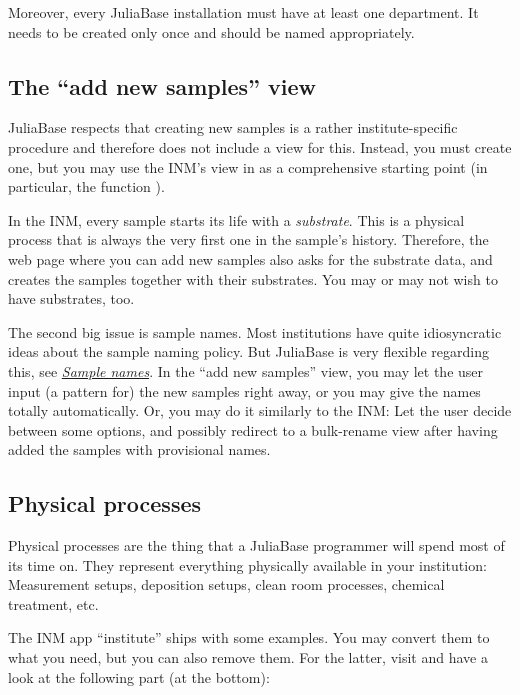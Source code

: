 \documentclass[a4paper,11pt,english]{sphinxmanual}
\begin{document}
Moreover, every JuliaBase installation must have at least one department.  It
needs to be created only once and should be named appropriately.


\subsection{The “add new samples” view}
\label{programming/programming:index-4}\label{programming/programming:the-add-new-samples-view}
JuliaBase respects that creating new samples is a rather institute-specific
procedure and therefore does not include a view for this.  Instead, you must
create one, but you may use the INM's view in
 as a comprehensive starting point (in
particular, the function ).

In the INM, every sample starts its life with a \emph{substrate}.  This is a
physical process that is always the very first one in the sample's history.
Therefore, the web page where you can add new samples also asks for the
substrate data, and creates the samples together with their substrates.  You
may or may not wish to have substrates, too.

The second big issue is sample names.  Most institutions have quite
idiosyncratic ideas about the sample naming policy.  But JuliaBase is very
flexible regarding this, see {\hyperref[programming/sample_names::doc]{\emph{Sample names}}}.  In the “add new samples”
view, you may let the user input (a pattern for) the new samples right away, or
you may give the names totally automatically.  Or, you may do it similarly to
the INM: Let the user decide between some options, and possibly redirect to a
bulk-rename view after having added the samples with provisional names.


\subsection{Physical processes}
\label{programming/programming:index-5}\label{programming/programming:physical-processes}
Physical processes are the thing that a JuliaBase programmer will spend most of
its time on.  They represent everything physically available in your
institution: Measurement setups, deposition setups, clean room processes,
chemical treatment, etc.

The INM app “institute” ships with some examples.  You may convert them to what
you need, but you can also remove them.  For the latter, visit
 and have a look at the following part (at the
bottom):
\end{document}
